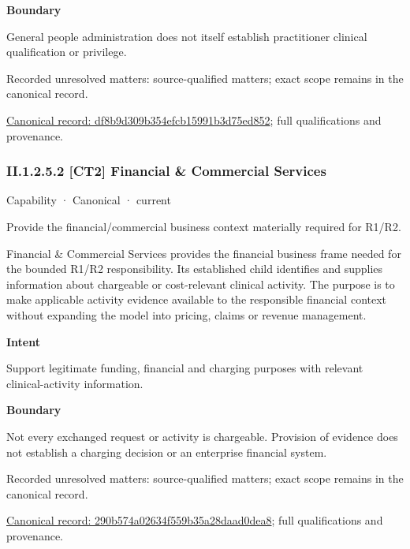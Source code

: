 \textbf{Boundary}



General people administration does not itself establish practitioner clinical qualification or privilege.


{\small Recorded unresolved matters: source-qualified matters; exact scope remains in the canonical record.}\par
{\footnotesize \href{../../../../../../../continuum/strategy/capability/df8b9d309b354efcb15991b3d75ed852.md}{Canonical record: df8b9d309b354efcb15991b3d75ed852}; full qualifications and provenance.}\par
\subsubsection*{II.1.2.5.2 [CT2] Financial \& Commercial Services}
\label{navigation:II.1.2.5.2}

\label{element:290b574a02634f559b35a28daad0dea8}
{\small Capability · Canonical · current}\par

Provide the financial/commercial business context materially required for R1/R2.



Financial \& Commercial Services provides the financial business frame needed for the bounded R1/R2 responsibility. Its established child identifies and supplies information about chargeable or cost-relevant clinical activity. The purpose is to make applicable activity evidence available to the responsible financial context without expanding the model into pricing, claims or revenue management.



\textbf{Intent}



Support legitimate funding, financial and charging purposes with relevant clinical-activity information.



\textbf{Boundary}



Not every exchanged request or activity is chargeable. Provision of evidence does not establish a charging decision or an enterprise financial system.


{\small Recorded unresolved matters: source-qualified matters; exact scope remains in the canonical record.}\par
{\footnotesize \href{../../../../../../../continuum/strategy/capability/290b574a02634f559b35a28daad0dea8.md}{Canonical record: 290b574a02634f559b35a28daad0dea8}; full qualifications and provenance.}\par
